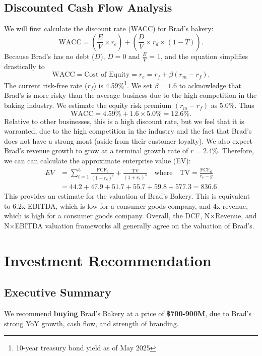 \documentclass[11pt]{article}
\begin{document}
    \subsection{Discounted Cash Flow Analysis}
    We will first calculate the discount rate (WACC) for Brad's bakery:
    \[
        \text{WACC} = \left( \frac{E}{V} \times r_e \right) + \left( \frac{D}{V} \times r_d \times (1 - T) \right)
    .\]
    Because Brad's has no debt ($D$), $D = 0$ and $\tfrac{E}{V}$ = 1, and the equation simplifies drastically to
    \[
        \text{WACC} = \text{Cost of Equity} = r_e = r_f + \beta (r_m - r_f)
    .\] 
    The current risk-free rate ($r_f$) is 4.59\%\footnote{10-year treasury bond yield as of May 2025}. We set $\beta = 1.6$ to acknowledge that Brad's is more risky than the average business due to the high competition in the baking industry. We estimate the equity risk premium $(r_m - r_f)$ as 5.0\%. Thus
    \[
        \text{WACC} = 4.59\% + 1.6 \times 5.0\% = 12.6\%
    .\] 
    Relative to other businesses, this is a high discount rate, but we feel that it is warranted, due to the high competition in the industry and the fact that Brad's does not have a strong moat (aside from their customer loyalty). We also expect Brad's revenue growth to grow at a terminal growth rate of $r = 2.4$\%. Therefore, we can can calculate the approximate enterprise value (EV):
    \begin{align*}
        EV &= \sum_{t=1}^{5} \frac{\text{FCF}_t}{(1 + r_e)^t} + \frac{\text{TV}}{(1 + r_e)^5}
        \quad \text{where} \quad \text{TV} = \frac{\text{FCF}_6}{r_e - g} \\
           &= 44.2 + 47.9 + 51.7 + 55.7 + 59.8 + 577.3 = 836.6 
    \end{align*}
    This provides an estimate for the valuation of Brad's Bakery. This is equivalent to 6.2x EBITDA, which is low for a consumer goods company, and 4x revenue, which is high for a consumer goods company. Overall, the DCF, N$\times$Revenue, and N$\times$EBITDA valuation frameworks all generally agree on the valuation of Brad's.
\section{Investment Recommendation}
    \subsection{Executive Summary}
        We recommend \textbf{buying} Brad's Bakery at a price of \textbf{\$700-900M}, due to Brad's strong YoY growth, cash flow, and strength of branding. 
\end{document}
